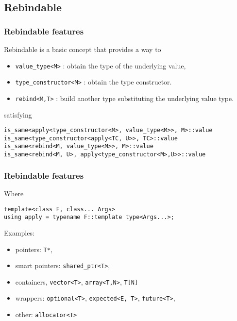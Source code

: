 \documentclass[xcolor=dvipsnames]{beamer}
\newcommand{\cpp}[1]{\lstinline{#1}}
\begin{document}
\subsection{Rebindable}

\begin{frame}[fragile]
\frametitle{Rebindable features}

Rebindable is a basic concept that provides a way to

\begin{itemize}
  \item \cpp{value_type<M>} : obtain the type of the underlying value, 
  \item \cpp{type_constructor<M>} : obtain the type constructor. 
  \item \cpp{rebind<M,T>} : build another type substituting the underlying value type. 
\end{itemize}

satisfying 

\begin{lstlisting}
is_same<apply<type_constructor<M>, value_type<M>>, M>::value
is_same<type_constructor<apply<TC, U>>, TC>::value
is_same<rebind<M, value_type<M>>, M>::value
is_same<rebind<M, U>, apply<type_constructor<M>,U>>::value
\end{lstlisting}

\end{frame}
\begin{frame}[fragile]
\frametitle{Rebindable features}

Where

\begin{lstlisting}
template<class F, class... Args>
using apply = typename F::template type<Args...>;
\end{lstlisting}

Examples:
\begin{itemize}
  \item pointers:  \cpp{T*}, 
  \item smart pointers: \cpp{shared_ptr<T>}, 
  \item containers, \cpp{vector<T>},  \cpp{array<T,N>},  \cpp{T[N]} 
  \item wrappers: \cpp{optional<T>}, \cpp{expected<E, T>}, \cpp{future<T>},
  \item other: \cpp{allocator<T>}   
\end{itemize}

\end{frame}
\end{document}
